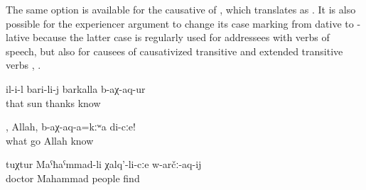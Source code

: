 The same option is available for the causative of , which translates as  . It is also possible for the experiencer argument to change its case marking from dative to -lative because the latter case is regularly used for addressees with verbs of speech, but also for causees of causativized transitive and extended transitive verbs , .
%
\begin{exe}
	\ex	\label{ex:‎He thanked the sun}
	\gll	il-i-l	bari-li-j	barkalla	b-aχ-aq-ur\\
		that	sun	thanks	know\\
	\glt	{}

	\ex	\label{ex:Allah, tell me what happened}
	\gll	[ce	ag-ur=el],	Allah,	b-aχ-aq-a=kːʷa	di-cːe!\\
		what	go	Allah	know	\\
	\glt	{}

	\ex	\label{ex:(that) doctor Mahammad makes the people find (him)}
	\gll	tuχtur	Maˁħaˁmmad-li	χalq'-li-cːe	w-arčː-aq-ij\\
		doctor	Mahammad	people	find\\
	\glt	{}
\end{exe}

